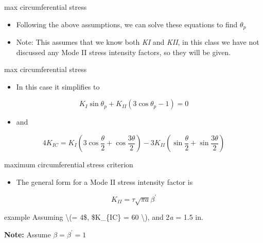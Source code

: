 \documentclass[
  letterpaper,
  ignorenonframetext,
  aspectratio=43,
  handout,
  12pt]{beamer}
\providecommand{\tightlist}{%
  \setlength{\itemsep}{0pt}\setlength{\parskip}{0pt}}
\providecommand{\tightlist}{%
\setlength{\itemsep}{0pt}\setlength{\parskip}{0pt}}
\begin{document}
\begin{frame}{max circumferential stress}
\protect\hypertarget{max-circumferential-stress-2}{}
\begin{itemize}
\tightlist
\item
  Following the above assumptions, we can solve these equations to find
  \(\theta_p\)
\item
  Note: This assumes that we know both \emph{K}\emph{I} and
  \emph{K}\emph{II}, in this class we have not discussed any Mode II
  stress intensity factors, so they will be given.
\end{itemize}
\end{frame}

\begin{frame}{max circumferential stress}
\protect\hypertarget{max-circumferential-stress-3}{}
\begin{itemize}
\tightlist
\item
  In this case it simplifies to
\end{itemize}

\[K_I \sin \theta_p + K_{II} (3\cos \theta_p -1) = 0\]

\begin{itemize}
\tightlist
\item
  and
\end{itemize}

\[4K_{IC} = K_I\left(3\cos \frac{\theta}{2} + \cos \frac{3\theta}{2}\right) - 3K_{II}\left(\sin \frac{\theta}{2} + \sin \frac{3\theta}{2}\right)\]
\end{frame}

\begin{frame}{maximum circumferential stress criterion}
\protect\hypertarget{maximum-circumferential-stress-criterion}{}
\begin{itemize}
\tightlist
\item
  The general form for a Mode II stress intensity factor is
\end{itemize}

\[K_{II} = \tau \sqrt{\pi a} \beta^\prime\]
\end{frame}

\begin{frame}{example}
\protect\hypertarget{example-1}{}
Assuming \textbackslash(\sigma = 4\tau\$, \$K\_\{IC\} = 60 
\textbackslash), and 2\emph{a} = 1.5 in.

\textbf{Note:} Assume \(\beta = \beta^\prime = 1\)
\end{frame}
\end{document}
